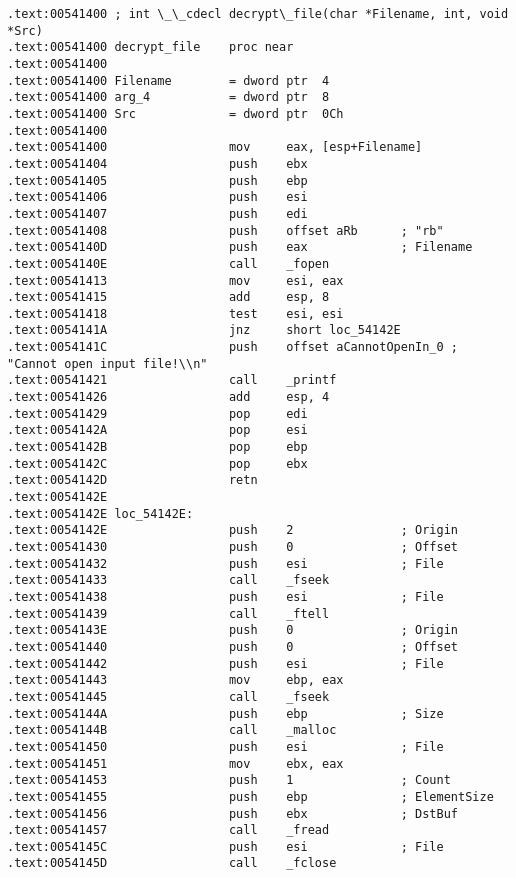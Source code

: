 \begin{lstlisting}[style=customasmx86]
.text:00541400 ; int \_\_cdecl decrypt\_file(char *Filename, int, void *Src)
.text:00541400 decrypt_file    proc near
.text:00541400
.text:00541400 Filename        = dword ptr  4
.text:00541400 arg_4           = dword ptr  8
.text:00541400 Src             = dword ptr  0Ch
.text:00541400
.text:00541400                 mov     eax, [esp+Filename]
.text:00541404                 push    ebx
.text:00541405                 push    ebp
.text:00541406                 push    esi
.text:00541407                 push    edi
.text:00541408                 push    offset aRb      ; "rb"
.text:0054140D                 push    eax             ; Filename
.text:0054140E                 call    _fopen
.text:00541413                 mov     esi, eax
.text:00541415                 add     esp, 8
.text:00541418                 test    esi, esi
.text:0054141A                 jnz     short loc_54142E
.text:0054141C                 push    offset aCannotOpenIn_0 ; "Cannot open input file!\\n"
.text:00541421                 call    _printf
.text:00541426                 add     esp, 4
.text:00541429                 pop     edi
.text:0054142A                 pop     esi
.text:0054142B                 pop     ebp
.text:0054142C                 pop     ebx
.text:0054142D                 retn
.text:0054142E
.text:0054142E loc_54142E:
.text:0054142E                 push    2               ; Origin
.text:00541430                 push    0               ; Offset
.text:00541432                 push    esi             ; File
.text:00541433                 call    _fseek
.text:00541438                 push    esi             ; File
.text:00541439                 call    _ftell
.text:0054143E                 push    0               ; Origin
.text:00541440                 push    0               ; Offset
.text:00541442                 push    esi             ; File
.text:00541443                 mov     ebp, eax
.text:00541445                 call    _fseek
.text:0054144A                 push    ebp             ; Size
.text:0054144B                 call    _malloc
.text:00541450                 push    esi             ; File
.text:00541451                 mov     ebx, eax
.text:00541453                 push    1               ; Count
.text:00541455                 push    ebp             ; ElementSize
.text:00541456                 push    ebx             ; DstBuf
.text:00541457                 call    _fread
.text:0054145C                 push    esi             ; File
.text:0054145D                 call    _fclose
\end{lstlisting}

